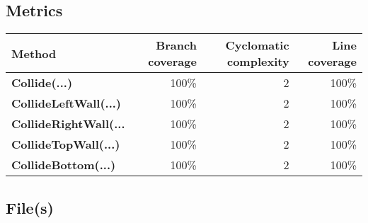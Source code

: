 \documentclass[a4paper,landscape,10pt]{article}
\begin{document}
\subsection{Metrics}
\begin{longtable}[l]{|l|r|r|r|}
\hline
\textbf{Method} & \textbf{Branch coverage} & \textbf{Cyclomatic complexity} & \textbf{Line coverage}\\
\hline
\textbf{Collide(...)} & 100\% & 2 & 100\%\\
\hline
\textbf{CollideLeftWall(...)} & 100\% & 2 & 100\%\\
\hline
\textbf{CollideRightWall(...} & 100\% & 2 & 100\%\\
\hline
\textbf{CollideTopWall(...)} & 100\% & 2 & 100\%\\
\hline
\textbf{CollideBottom(...)} & 100\% & 2 & 100\%\\
\hline
\end{longtable}
\subsection{File(s)}
\end{document}
